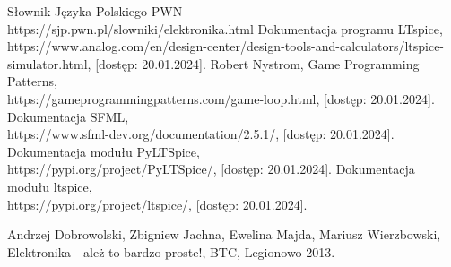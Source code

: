 \documentclass[12pt, a4paper]{article} %
\begin{document}
% 
% 
\begin{thebibliography}{9}
Słownik Języka Polskiego PWN\\ https://sjp.pwn.pl/slowniki/elektronika.html
Dokumentacja programu LTspice,
\\https://www.analog.com/en/design-center/design-tools-and-calculators/ltspice-simulator.html,
[dostęp: 20.01.2024].
Robert Nystrom, Game Programming Patterns,\\ https://gameprogrammingpatterns.com/game-loop.html,
[dostęp: 20.01.2024].
Dokumentacja SFML,
\\https://www.sfml-dev.org/documentation/2.5.1/,
[dostęp: 20.01.2024].
Dokumentacja modułu PyLTSpice,
\\https://pypi.org/project/PyLTSpice/,
[dostęp: 20.01.2024].
Dokumentacja modułu ltspice,
\\https://pypi.org/project/ltspice/,
[dostęp: 20.01.2024].

Andrzej Dobrowolski, Zbigniew Jachna, Ewelina Majda, Mariusz Wierzbowski, Elektronika - ależ to bardzo proste!,
BTC, Legionowo 2013.


\end{thebibliography}
\end{document}
